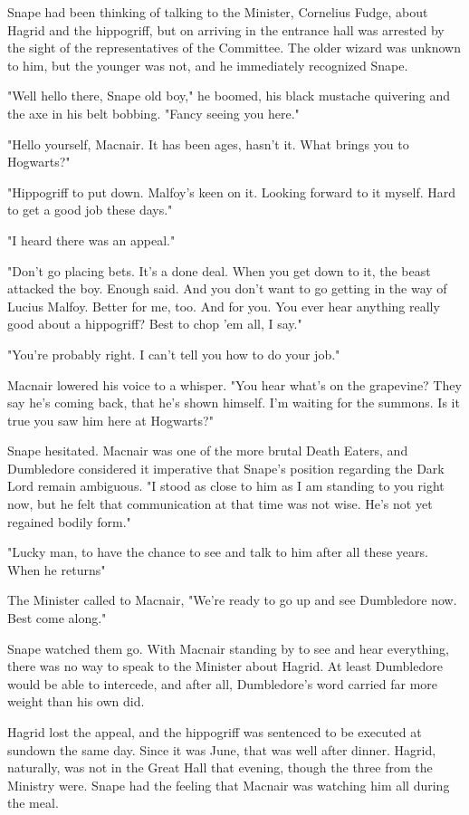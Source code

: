 Snape had been thinking of talking to the Minister, Cornelius Fudge, about Hagrid and the hippogriff, but on arriving in the entrance hall was arrested by the sight of the representatives of the Committee. The older wizard was unknown to him, but the younger was not, and he immediately recognized Snape.

"Well hello there, Snape old boy," he boomed, his black mustache quivering and the axe in his belt bobbing. "Fancy seeing you here."

"Hello yourself, Macnair. It has been ages, hasn't it. What brings you to Hogwarts?"

"Hippogriff to put down. Malfoy's keen on it. Looking forward to it myself. Hard to get a good job these days."

"I heard there was an appeal."

"Don't go placing bets. It's a done deal. When you get down to it, the beast attacked the boy. Enough said. And you don't want to go getting in the way of Lucius Malfoy. Better for me, too. And for you. You ever hear anything really good about a hippogriff? Best to chop 'em all, I say."

"You're probably right. I can't tell you how to do your job."

Macnair lowered his voice to a whisper. "You hear what's on the grapevine? They say he's coming back, that he's shown himself. I'm waiting for the summons. Is it true you saw him here at Hogwarts?"

Snape hesitated. Macnair was one of the more brutal Death Eaters, and Dumbledore considered it imperative that Snape's position regarding the Dark Lord remain ambiguous. "I stood as close to him as I am standing to you right now, but he felt that communication at that time was not wise. He's not yet regained bodily form."

"Lucky man, to have the chance to see and talk to him after all these years. When he returns{\el}"

The Minister called to Macnair, "We're ready to go up and see Dumbledore now. Best come along."

Snape watched them go. With Macnair standing by to see and hear everything, there was no way to speak to the Minister about Hagrid. At least Dumbledore would be able to intercede, and after all, Dumbledore's word carried far more weight than his own did.

Hagrid lost the appeal, and the hippogriff was sentenced to be executed at sundown the same day. Since it was June, that was well after dinner. Hagrid, naturally, was not in the Great Hall that evening, though the three from the Ministry were. Snape had the feeling that Macnair was watching him all during the meal.

